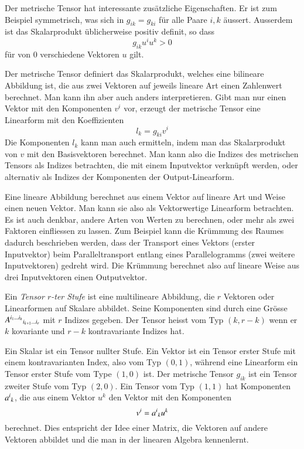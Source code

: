 Der metrische Tensor hat interessante zusätzliche Eigenschaften.
Er ist zum Beispiel symmetrisch, was sich in $g_{ik}=g_{ki}$ für
alle Paare $i,k$ äussert.
Ausserdem ist das Skalarprodukt üblicherweise positiv definit,
so dass 
\[
g_{ik}u^i u^k
>
0
\]
für von $0$ verschiedene Vektoren $u$ gilt.

Der metrische Tensor definiert das Skalarprodukt, welches eine bilineare
Abbildung ist, die aus zwei Vektoren auf jeweils lineare Art einen
Zahlenwert berechnet.
Man kann ihn aber auch anders interpretieren.
Gibt man nur einen Vektor mit den Komponenten $v^i$ vor, erzeugt der
metrische Tensor eine Linearform mit den Koeffizienten
\[
l_k = g_{ki}v^i
\]
Die Komponenten $l_k$ kann man auch ermitteln, indem man das Skalarprodukt
von $v$ mit den Basisvektoren berechnet.
Man kann also die Indizes des metrischen Tensors als Indizes betrachten,
die mit einem Inputvektor verknüpft werden, oder alternativ als Indizes
der Komponenten der Output-Linearform.

Eine lineare Abbildung berechnet aus einem Vektor auf lineare
Art und Weise einen neuen Vektor.
Man kann sie also als Vektorwertige Linearform betrachten.
Es ist auch denkbar, andere Arten von Werten zu berechnen, oder
mehr als zwei Faktoren einfliessen zu lassen.
Zum Beispiel kann die Krümmung des Raumes dadurch beschrieben werden,
dass der Transport eines Vektors (erster Inputvektor) beim Paralleltransport
entlang eines Parallelogramms (zwei weitere Inputvektoren) gedreht wird.
Die Krümmung berechnet also auf lineare Weise aus drei Inputvektoren
einen Outputvektor.

\begin{definition}[Tensor]
%
Ein {\em Tensor $r$-ter Stufe} ist eine multilineare Abbildung, die
$r$ Vektoren oder Linearformen auf Skalare abbildet.
Seine Komponenten sind durch eine Grösse
$A^{i_1\dots i_k}\mathstrut_{i_{k+1}\dots i_r}$
mit $r$ Indizes gegeben.
Der Tensor heisst vom Typ $(k,r-k)$ wenn er $k$ kovariante und 
$r-k$ kontravariante Indizes hat.
\end{definition}

Ein Skalar ist ein Tensor nullter Stufe.
Ein Vektor ist ein Tensor erster Stufe mit einem kontravarianten Index,
also vom Typ $(0,1)$, während eine Linearform ein Tensor erster
Stufe vom Type $(1,0)$ ist.
Der metrische Tensor $g_{ik}$ ist ein Tensor zweiter Stufe vom Typ
$(2,0)$.
Ein Tensor vom Typ $(1,1)$ hat Komponenten $a^i\mathstrut_k$, die aus
einem Vektor $u^k$ den Vektor mit den Komponenten
\[
v^i = a^i\mathstrut_k u^k
\]
berechnet.
Dies entspricht der Idee einer Matrix, die Vektoren auf andere 
Vektoren abbildet und die man in der linearen Algebra kennenlernt.

